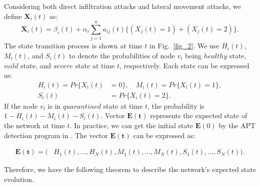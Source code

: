 \documentclass[lettersize,journal]{IEEEtran}
\begin{document}
Considering both direct infiltration attacks and lateral movement attacks, we define $\bm{X}_i(t)$ as:
\begin{equation}
\label{eq_trans}
\bm{X}_i(t)=\beta_i(t)+\alpha_i\sum_{j=1}^na_{ij}(t)\{(X_j(t)=1)+(X_j(t)=2)\}.
\end{equation}
The state transition process is shown at time $t$ in Fig.~\ref{fig_2}. We use $H_i(t)$, $M_i(t)$, and $S_i(t)$ to denote the probabilities of node $v_i$ being $healthy$ state, $mild$ state, and $severe$ state at time $t$, respectively. Each state can be expressed as:
\begin{equation}
\label{eq_problity}
\begin{split}
H_i(t)=Pr\{ X_i(t)&=0\},\quad M_i(t)=Pr\{ X_i(t)=1\}, \\
 S_i(t)&=Pr\{ X_i(t)=2\}.    
\end{split}
\end{equation}
 If the node $v_i$ is in $quarantined$ state at time $t$, the probability is $1-H_i(t)-M_i(t)-S_i(t)$. 
Vector $\bm{E(t)}$ represents the expected state of the network at time $t$. In practice, we can get the initial state $\bm{E}(0)$ by the APT detection program in \cite{xiong2022conan,ghafir2018detection,milajerdi2019holmes}. The vector $\bm{E(t)}$ can be expressed as:
\begin{small}
   \begin{equation}
\label{eq_pvector}
\begin{split}
\bm{E(t)}=(&H_1(t),...,H_N(t),M_1(t),...,M_N(t),S_1(t),...,S_N(t)).
\end{split}
\end{equation} 
\end{small}\par
 Therefore, we have the following theorem to describe the network's expected state evolution.
\end{document}
